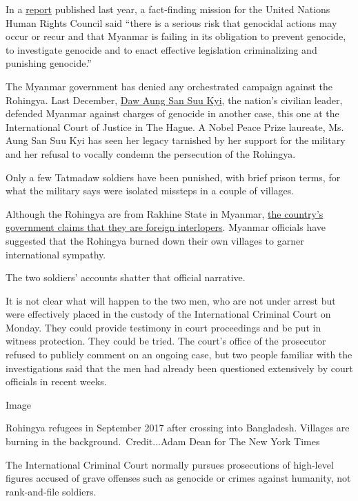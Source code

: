 In a
\href{https://www.ohchr.org/Documents/HRBodies/HRCouncil/FFM-Myanmar/20190916/A_HRC_42_CRP.5.pdf}{report}
published last year, a fact-finding mission for the United Nations Human
Rights Council said ``there is a serious risk that genocidal actions may
occur or recur and that Myanmar is failing in its obligation to prevent
genocide, to investigate genocide and to enact effective legislation
criminalizing and punishing genocide.''

The Myanmar government has denied any orchestrated campaign against the
Rohingya. Last December,
\href{https://www.nytimes3xbfgragh.onion/2019/12/10/world/asia/aung-san-suu-kyi-myanmar-genocide-hague.html}{Daw
Aung San Suu Kyi}, the nation's civilian leader, defended Myanmar
against charges of genocide in another case, this one at the
International Court of Justice in The Hague. A Nobel Peace Prize
laureate, Ms. Aung San Suu Kyi has seen her legacy tarnished by her
support for the military and her refusal to vocally condemn the
persecution of the Rohingya.

Only a few Tatmadaw soldiers have been punished, with brief prison
terms, for what the military says were isolated missteps in a couple of
villages.

Although the Rohingya are from Rakhine State in Myanmar,
\href{https://www.nytimes3xbfgragh.onion/2017/10/24/world/asia/myanmar-rohingya-ethnic-cleansing.html}{the
country's government claims that they are foreign interlopers}. Myanmar
officials have suggested that the Rohingya burned down their own
villages to garner international sympathy.

The two soldiers' accounts shatter that official narrative.

It is not clear what will happen to the two men, who are not under
arrest but were effectively placed in the custody of the International
Criminal Court on Monday. They could provide testimony in court
proceedings and be put in witness protection. They could be tried. The
court's office of the prosecutor refused to publicly comment on an
ongoing case, but two people familiar with the investigations said that
the men had already been questioned extensively by court officials in
recent weeks.

Image

Rohingya refugees in September 2017 after crossing into Bangladesh.
Villages are burning in the background.~Credit...Adam Dean for The New
York Times

The International Criminal Court normally pursues prosecutions of
high-level figures accused of grave offenses such as genocide or crimes
against humanity, not rank-and-file soldiers.

